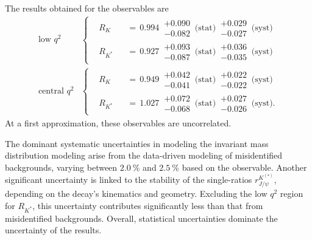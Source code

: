 The results obtained for the observables are
\begin{align*}
    \text{low $q^2$} 
    &\left\{
    \begin{aligned}
        &R_{K}  \!\!\!\!\!\!\!&&=\, 0.994 \,\substack{+0.090 \\ -0.082}\,\text{(stat)}\,\substack{+0.029 \\ -0.027}\,\text{(syst)}\\
        &R_{K^*}\!\!\!\!\!\!\!&&=\, 0.927 \,\substack{+0.093 \\ -0.087}\,\text{(stat)}\,\substack{+0.036 \\ -0.035}\,\text{(syst)}
    \end{aligned}
    \right. \\
    \text{central $q^2$} 
    &\left\{
    \begin{aligned}
        &R_{K}  \!\!\!\!\!\!\!&&=\, 0.949 \,\substack{+0.042 \\ -0.041}\,\text{(stat)}\,\substack{+0.022 \\ -0.022}\,\text{(syst)}\\
        &R_{K^*}\!\!\!\!\!\!\!&&=\, 1.027 \,\substack{+0.072 \\ -0.068}\,\text{(stat)}\,\substack{+0.027 \\ -0.026}\,\text{(syst)}.
    \end{aligned}
    \right.
\end{align*}
At a first approximation, these observables are uncorrelated.

The dominant systematic uncertainties in modeling the invariant mass distribution 
modeling arise from the data-driven modeling of misidentified backgrounds, 
varying between $\SI{2.0}{\%}$ and $\SI{2.5}{\%}$ based on the observable. 
Another significant uncertainty is linked to the stability of the 
single-ratios $r^{K^{(*)}}_{J\!/\!\psi}$, depending on the decay's kinematics 
and geometry. Excluding the low $q^2$ region for $R_{K^*}$, this uncertainty contributes 
significantly less than that from misidentified backgrounds. Overall, statistical 
uncertainties dominate the uncertainty of the results.

